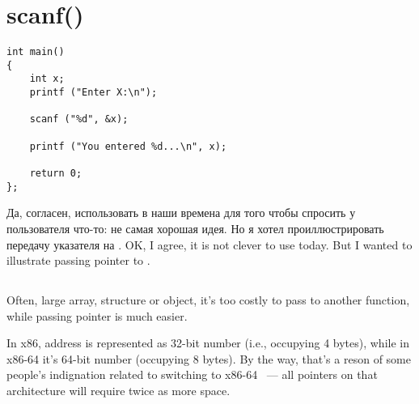 ﻿\section{scanf()}


\begin{lstlisting}
int main() 
{
	int x;
	printf ("Enter X:\n");

	scanf ("%d", &x);

	printf ("You entered %d...\n", x);

	return 0;
};
\end{lstlisting}

\IFRU
{Да, согласен, использовать \scanf в наши времена для того чтобы спросить у пользователя что-то: 
не самая хорошая идея.
Но я хотел проиллюстрировать передачу указателя на \Tint.}
{OK, I agree, it is not clever to use \scanf today. But I wanted to illustrate passing pointer to \Tint.}

\subsection{}
\index{\CLanguageElements!\Pointers}

{Often, large array, structure or object, it's too costly to pass to another function, while passing pointer
is much easier.}
 \CCpp {}

{In x86, address is represented as 32-bit number (i.e., occupying 4 bytes), while in x86-64 it's 64-bit number
(occupying 8 bytes).}
{By the way, that's a reson of some people's indignation related to switching to x86-64 ~--- all pointers
on that architecture will require twice as more space.}

